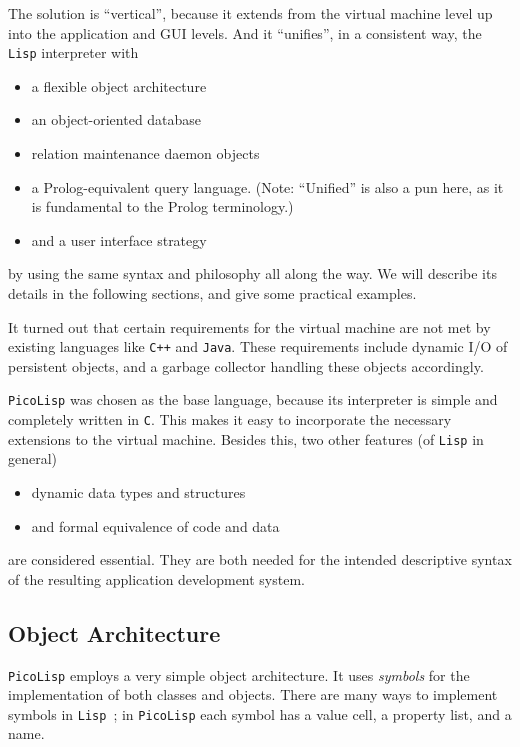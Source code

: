 The solution is ``vertical'', because it extends from the virtual machine
level up into the application and GUI levels. And it ``unifies'', in a
consistent way, the \texttt{Lisp} interpreter with

\begin{itemize}
\item a flexible object architecture
\item an object-oriented database
\item relation maintenance daemon objects
\item a Prolog-equivalent query language. (Note: ``Unified'' is also a pun
   here, as it is fundamental to the Prolog terminology.)
\item and a user interface strategy
\end{itemize}

by using the same syntax and philosophy all along the way. We will
describe its details in the following sections, and give some practical
examples.

It turned out that certain requirements for the virtual machine are not
met by existing languages like \texttt{C++} and \texttt{Java}. These requirements
include dynamic I/O of persistent objects, and a garbage collector
handling these objects accordingly.

\texttt{PicoLisp} was chosen as the base language, because its interpreter is
simple and completely written in \texttt{C}. This makes it easy to incorporate
the necessary extensions to the virtual machine. Besides this, two other
features (of \texttt{Lisp} in general)

\begin{itemize}
\item dynamic data types and structures
\item and formal equivalence of code and data
\end{itemize}

are considered essential. They are both needed for the intended
descriptive syntax of the resulting application development system.

 
\subsection{Object Architecture}
\label{sec:ul-obj-arch}


\texttt{PicoLisp} employs a very simple object architecture. It uses
\emph{symbols} for the implementation of both classes and objects.
There are many ways to implement symbols in \texttt{Lisp}~\cite{allen};
in \texttt{PicoLisp} each symbol has a value cell, a property list,
and a name.

